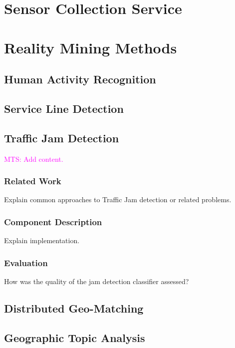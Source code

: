 \documentclass[external]{20120615_deliverable_template_ukob}
\theoremstyle{definition}
\newcommand{\todo}[2]{\textcolor{magenta}{#1: #2}}
\begin{document}
\clearpage
\chapter{Sensor Collection Service}


\clearpage
\chapter{Reality Mining Methods}

\section{Human Activity Recognition}


\section{Service Line Detection}


\section{Traffic Jam Detection}
\todo{MTS}{Add content.}

\subsection{Related Work}
Explain common approaches to Traffic Jam detection or related problems.

\subsection{Component Description}
Explain implementation. 

\subsection{Evaluation}
How was the quality of the jam detection classifier assessed?

\section{Distributed Geo-Matching}


\section{Geographic Topic Analysis}



\end{document}
